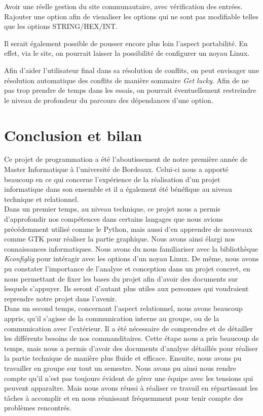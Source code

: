 \documentclass[17pts]{report}
\begin{document}
    Avoir une réelle gestion du site communautaire, avec vérification des
    entrées.  Rajouter une option afin de visualiser les options qui ne sont
    pas modifiable telles que les options STRING/HEX/INT.

    Il serait également possible de pousser encore plus loin l'aspect
    portabilité.  En effet, via le site, on pourrait laisser la possibilité de
    configurer un noyau Linux.

    Afin d'aider l'utilisateur final dans sa résolution de conflits, on peut
    envisager une résolution automatique des conflits de manière sommaire
    \textit{Get lucky}.  Afin de ne pas trop prendre de temps dans les
    essais, on pourrait éventuellement restreindre le niveau de profondeur du
    parcours des dépendances d'une option.

\chapter{Conclusion et bilan}
\label{cha:Conclusion et bilan}
Ce projet de programmation a été l'aboutissement de notre première année de
Master Informatique à l'université de Bordeaux. Celui-ci nous a apporté
beaucoup en ce qui concerne l'expérience de la réalisation d'un projet
informatique dans son ensemble et il a également été bénéfique au niveau
technique et relationnel.\\

Dans un premier temps, au niveau technique, ce projet nous a permis
d'approfondir nos compétences dans certains langages que nous avions
précédemment utilisé comme le Python, mais aussi d'en apprendre de nouveaux
comme GTK pour réaliser la partie graphique. Nous avons ainsi élargi nos
connaissances informatiques. Nous avons du nous familiariser avec la
bibliothèque \textit{Kconfiglig} pour intéragir avec les options d'un noyau Linux. De
même, nous avons pu constater l'importance de l'analyse et conception dans un
projet concret, en nous permettant de fixer les bases du projet afin d'avoir
des documents sur lesquels s'appuyer. Ils seront d'autant plus utiles aux
personnes qui voudraient reprendre notre projet dans l'avenir.\\

Dans un second temps, concernant l'aspect relationnel, nous avons beaucoup
appris, qu'il s'agisse de la communication interne au groupe, ou de la
communication avec l'extérieur. Il a été nécessaire de comprendre et de
détailler les différents besoins de nos commanditaires. Cette étape nous a pris
beaucoup de temps, mais nous a permis d'avoir des documents d'analyse détaillés
pour réaliser la partie technique de manière plus fluide et efficace.  Ensuite,
nous avons pu travailler en groupe sur tout un semestre. Nous avons pu ainsi
nous rendre compte qu'il n'est pas toujours évident de gérer une équipe avec
les tensions qui peuvent apparaître. Mais nous avons réussi à réaliser ce
travail en répartissant les tâches à accomplir et en nous réunissant
fréquemment pour tenir compte des problèmes rencontrés.\\
\end{document}
